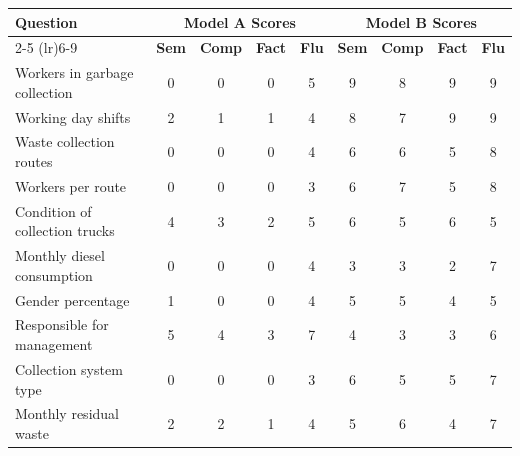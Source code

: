 \begin{longtable}{p{5cm}|cccc|cccc}
    \toprule
    \multirow{2}{*}{\textbf{Question}} & \multicolumn{4}{c|}{\textbf{Model A Scores}} & \multicolumn{4}{c}{\textbf{Model B Scores}} \\
    \cmidrule(lr){2-5} \cmidrule(lr){6-9}
    & \textbf{Sem} & \textbf{Comp} & \textbf{Fact} & \textbf{Flu} & \textbf{Sem} & \textbf{Comp} & \textbf{Fact} & \textbf{Flu} \\
    \midrule
    \endhead
    Workers in garbage collection        & 0            & 0             & 0             & 5            & 9            & 8             & 9             & 9            \\
    \hline
    Working day shifts                   & 2            & 1             & 1             & 4            & 8            & 7             & 9             & 9            \\
    \hline
    Waste collection routes              & 0            & 0             & 0             & 4            & 6            & 6             & 5             & 8            \\
    \hline
    Workers per route                    & 0            & 0             & 0             & 3            & 6            & 7             & 5             & 8            \\
    \hline
    Condition of collection trucks       & 4            & 3             & 2             & 5            & 6            & 5             & 6             & 5            \\
    \hline
    Monthly diesel consumption           & 0            & 0             & 0             & 4            & 3            & 3             & 2             & 7            \\
    \hline
    Gender percentage                    & 1            & 0             & 0             & 4            & 5            & 5             & 4             & 5            \\
    \hline
    Responsible for management           & 5            & 4             & 3             & 7            & 4            & 3             & 3             & 6            \\
    \hline
    Collection system type               & 0            & 0             & 0             & 3            & 6            & 5             & 5             & 7            \\
    \hline
    Monthly residual waste               & 2            & 2             & 1             & 4            & 5            & 6             & 4             & 7            \\

\end{longtable}
